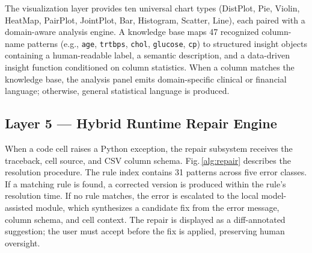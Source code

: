 \documentclass[conference]{IEEEtran}
\begin{document}
The visualization layer provides ten universal chart types (DistPlot,
Pie, Violin, HeatMap, PairPlot, JointPlot, Bar, Histogram, Scatter,
Line), each paired with a domain-aware analysis engine. A knowledge
base maps 47 recognized column-name patterns (e.g., \texttt{age},
\texttt{trtbps}, \texttt{chol}, \texttt{glucose}, \texttt{cp})
to structured insight objects containing a human-readable label, a
semantic description, and a data-driven insight function conditioned
on column statistics. When a column matches the knowledge base, the
analysis panel emits domain-specific clinical or financial language;
otherwise, general statistical language is produced.

\subsection{Layer 5 — Hybrid Runtime Repair Engine}

When a code cell raises a Python exception, the repair subsystem
receives the traceback, cell source, and CSV column schema.
Fig.\,\ref{alg:repair} describes the resolution procedure. The rule
index contains 31 patterns across five error classes. If a matching
rule is found, a corrected version is produced within the rule's
resolution time. If no rule matches, the error is escalated to the
local model-assisted module, which synthesizes a candidate fix from
the error message, column schema, and cell context. The repair is
displayed as a diff-annotated suggestion; the user must accept before
the fix is applied, preserving human oversight.
\end{document}
